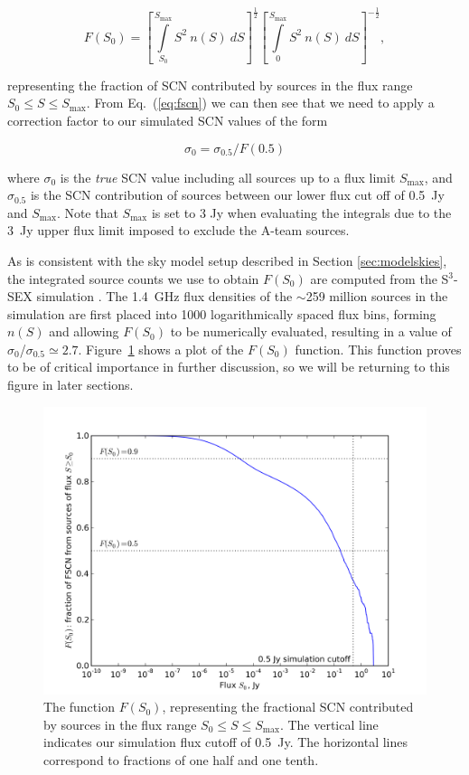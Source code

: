\documentclass{aa}
\begin{document}
\begin{equation}
F(S_0) = \left[\int\limits_{S_0}^{S_\mathrm{max}} S^{2}~n(S)~dS\right]^\frac{1}{2} \left[\int\limits_{0}^{S_\mathrm{max}} S^{2}~n(S)~dS\right]^{-\frac{1}{2}},
\label{eq:fscn_correction}
\end{equation}

representing the fraction of SCN contributed by sources in the flux range $S_0\leq S \leq S_\mathrm{max}$. From Eq.~(\ref{eq:fscn}) we can then see that we need to apply a correction factor to our simulated SCN values of the form

\begin{equation}
\sigma_{0} = \sigma_{0.5}/F(0.5)
\label{eq:fscn_correction1}
\end{equation}


\noindent where $\sigma_{0}$ is the \emph{true} SCN value including all sources up to a flux limit $S_\mathrm{max}$, and $\sigma_{0.5}$ is the SCN contribution of sources between our lower flux cut off of 0.5~Jy and $S_\mathrm{max}$. Note that $S_\mathrm{max}$ is set to 3 Jy when evaluating the integrals due to the 3~Jy upper flux limit imposed to exclude the A-team sources. 

As is consistent with the sky model setup described in Section \ref{sec:modelskies}, the integrated source counts we use to
obtain $F(S_0)$ are computed from the S$^{3}$-SEX simulation \citep{Wilman-simulation}. The 1.4~GHz flux densities of the $\sim$259 million sources in the simulation are first placed into 1000 logarithmically spaced flux bins, forming $n(S)$ and allowing $F(S_0)$ to be numerically evaluated, resulting in a value of $\sigma_{0}$/$\sigma_{0.5}\simeq2.7$. Figure~\ref{fig:F(S)} shows a plot of the $F(S_0)$ function. This function proves to be of critical importance in further discussion, so we will be returning to this figure in later sections.

\begin{figure}
\centering
\includegraphics[width = \columnwidth]{fractional-fscn}
\caption{The function $F(S_0)$, representing the fractional SCN contributed by sources in the flux range $S_0\leq S \leq S_\mathrm{max}$.
The vertical line indicates our simulation flux cutoff of 0.5~Jy. The horizontal lines correspond to fractions of one half and one tenth.
\label{fig:F(S)}}
\end{figure}
\end{document}
